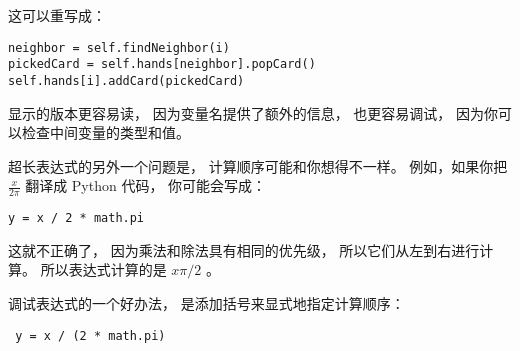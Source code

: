 
这可以重写成：

\begin{lstlisting}
neighbor = self.findNeighbor(i)
pickedCard = self.hands[neighbor].popCard()
self.hands[i].addCard(pickedCard)
\end{lstlisting}


显示的版本更容易读， 因为变量名提供了额外的信息， 也更容易调试， 因为你可以检查中间变量的类型和值。



超长表达式的另外一个问题是， 计算顺序可能和你想得不一样。
例如，如果你把 $\frac{x}{2 \pi}$ 翻译成 Python 代码， 你可能会写成：

\begin{lstlisting}
y = x / 2 * math.pi
\end{lstlisting}


这就不正确了， 因为乘法和除法具有相同的优先级， 所以它们从左到右进行计算。
所以表达式计算的是 $x \pi / 2$ 。


调试表达式的一个好办法， 是添加括号来显式地指定计算顺序：

\begin{lstlisting}
 y = x / (2 * math.pi)
\end{lstlisting}


